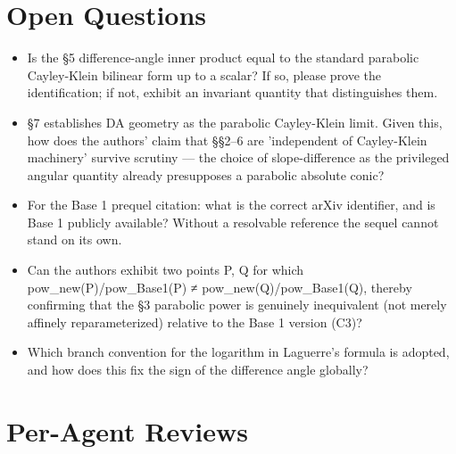 \documentclass[11pt]{article}
\begin{document}
\section*{Open Questions}
\begin{itemize}[leftmargin=*]
  \item Is the §5 difference-angle inner product equal to the standard parabolic Cayley-Klein bilinear form up to a scalar? If so, please prove the identification; if not, exhibit an invariant quantity that distinguishes them.
  \item §7 establishes DA geometry as the parabolic Cayley-Klein limit. Given this, how does the authors' claim that §§2–6 are 'independent of Cayley-Klein machinery' survive scrutiny — the choice of slope-difference as the privileged angular quantity already presupposes a parabolic absolute conic?
  \item For the Base 1 prequel citation: what is the correct arXiv identifier, and is Base 1 publicly available? Without a resolvable reference the sequel cannot stand on its own.
  \item Can the authors exhibit two points P, Q for which pow\_new(P)/pow\_Base1(P) ≠ pow\_new(Q)/pow\_Base1(Q), thereby confirming that the §3 parabolic power is genuinely inequivalent (not merely affinely reparameterized) relative to the Base 1 version (C3)?
  \item Which branch convention for the logarithm in Laguerre's formula is adopted, and how does this fix the sign of the difference angle globally?
\end{itemize}

\section*{Per-Agent Reviews}
\end{document}

